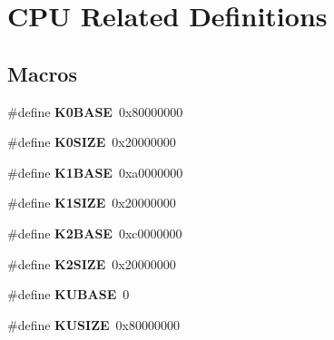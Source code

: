 \hypertarget{group__RTEMSScoreMIPSSet__idtcpu}{}\section{C\+PU Related Definitions}
\label{group__RTEMSScoreMIPSSet__idtcpu}
\subsection*{Macros}
\begin{DoxyCompactItemize}
\item 
\mbox{\label{group__RTEMSScoreMIPSSet__idtcpu_ga3895dc73e1b9343e0a0fd61037f0f887}} 
\#define {\bfseries K0\+B\+A\+SE}~0x80000000
\item 
\mbox{\label{group__RTEMSScoreMIPSSet__idtcpu_gafde3fc42d1d3dcf891cadcdb590f8d4b}} 
\#define {\bfseries K0\+S\+I\+ZE}~0x20000000
\item 
\mbox{\label{group__RTEMSScoreMIPSSet__idtcpu_ga6633ac67351b3315b65209bd155aa0e2}} 
\#define {\bfseries K1\+B\+A\+SE}~0xa0000000
\item 
\mbox{\label{group__RTEMSScoreMIPSSet__idtcpu_gae7d4257f7050069d35a6e940c45caf12}} 
\#define {\bfseries K1\+S\+I\+ZE}~0x20000000
\item 
\mbox{\label{group__RTEMSScoreMIPSSet__idtcpu_gace9d54246e55a11994c6e3ebe8aff525}} 
\#define {\bfseries K2\+B\+A\+SE}~0xc0000000
\item 
\mbox{\label{group__RTEMSScoreMIPSSet__idtcpu_ga6391ea25e673fbb03ac9b5f6337eece7}} 
\#define {\bfseries K2\+S\+I\+ZE}~0x20000000
\item 
\mbox{\label{group__RTEMSScoreMIPSSet__idtcpu_ga921a56ca8fba91ce2c187522eb4fa304}} 
\#define {\bfseries K\+U\+B\+A\+SE}~0
\item 
\mbox{\label{group__RTEMSScoreMIPSSet__idtcpu_ga2e400dd26a1afa6e6955b38a23870a8d}} 
\#define {\bfseries K\+U\+S\+I\+ZE}~0x80000000

\end{DoxyCompactItemize}
